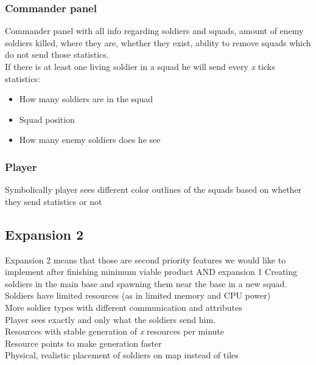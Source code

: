 \documentclass{article}
\begin{document}
\subsubsection{Commander panel}
Commander panel with all info regarding soldiers and squads, amount of enemy soldiers killed, where they are, whether they exist, ability to remove squads which do not send those statistics. \\ 
If there is at least one living soldier in a squad he will send every \textit{x} ticks statistics: 
\begin{itemize}
\item How many soldiers are in the squad 
\item Squad position
\item How many enemy soldiers does he see
\end{itemize} 

\subsubsection{Player}
Symbolically player sees different color outlines of the squads based on whether they send statistics or not

\subsection{Expansion 2}
Expansion 2 means that those are second priority features we would like to
implement after finishing minimum viable product AND expansion 1
Creating soldiers in the main base and spawning them near the base in a new squad. \\ 
Soldiers have limited resources (as in limited memory and CPU power) \\ 
More soldier types with different communication and attributes \\ 
Player sees exactly and only what the soldiers send him. \\
Resources with stable generation of \textit{x} resources per minute \\ 
Resource points to make generation faster \\
Physical, realistic placement of soldiers on map instead of tiles \\ 
\end{document}
